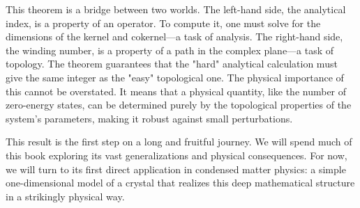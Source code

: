 This theorem is a bridge between two worlds.
The left-hand side, the analytical index, is a property of an operator.
To compute it, one must solve for the dimensions of the kernel and cokernel—a task of analysis.
The right-hand side, the winding number, is a property of a path in the complex plane—a task of topology.
The theorem guarantees that the "hard" analytical calculation must give the same integer as the "easy" topological one.
The physical importance of this cannot be overstated.
It means that a physical quantity, like the number of zero-energy states, can be determined purely by the topological properties of the system's parameters, making it robust against small perturbations.

This result is the first step on a long and fruitful journey.
We will spend much of this book exploring its vast generalizations and physical consequences.
For now, we will turn to its first direct application in condensed matter physics: a simple one-dimensional model of a crystal that realizes this deep mathematical structure in a strikingly physical way.

    
    

    
